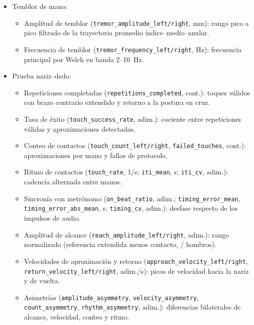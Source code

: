 \begin{sloppypar}
\begin{itemize}
    \item Temblor de mano:
    \begin{itemize}
        \item Amplitud de temblor (\texttt{tremor\_\allowbreak{}amplitude\_\allowbreak{}left/\allowbreak{}right}, mm): rango pico a pico filtrado de la trayectoria promedio índice--medio--anular.
        \item Frecuencia de temblor (\texttt{tremor\_\allowbreak{}frequency\_\allowbreak{}left/\allowbreak{}right}, Hz): frecuencia principal por Welch en banda 2--10~Hz.
    \end{itemize}

    \item Prueba nariz--dedo:
    \begin{itemize}
        \item Repeticiones completadas (\texttt{repetitions\_\allowbreak{}completed}, cont.): toques válidos con brazo contrario extendido y retorno a la postura en cruz.
        \item Tasa de éxito (\texttt{touch\_\allowbreak{}success\_\allowbreak{}rate}, adim.): cociente entre repeticiones válidas y aproximaciones detectadas.
        \item Conteo de contactos (\texttt{touch\_\allowbreak{}count\_\allowbreak{}left/\allowbreak{}right}, \texttt{failed\_\allowbreak{}touches}, cont.): aproximaciones por mano y fallos de protocolo.
        \item Ritmo de contactos (\texttt{touch\_rate}, 1/s; \texttt{iti\_mean}, s; \texttt{iti\_cv}, adim.): cadencia alternada entre manos.
        \item Sincronía con metrónomo (\texttt{on\_\allowbreak{}beat\_\allowbreak{}ratio}, adim.; \texttt{timing\_\allowbreak{}error\_\allowbreak{}mean}, \texttt{timing\_\allowbreak{}error\_\allowbreak{}abs\_\allowbreak{}mean}, s; \texttt{timing\_\allowbreak{}cv}, adim.): desfase respecto de los impulsos de audio.
        \item Amplitud de alcance (\texttt{reach\_\allowbreak{}amplitude\_\allowbreak{}left/\allowbreak{}right}, adim.): rango normalizado (referencia extendida menos contacto, / hombros).
        \item Velocidades de aproximación y retorno (\texttt{approach\_\allowbreak{}velocity\_\allowbreak{}left/\allowbreak{}right}, \texttt{return\_\allowbreak{}velocity\_\allowbreak{}left/\allowbreak{}right}, adim./s): picos de velocidad hacia la nariz y de vuelta.
        \item Asimetrías (\texttt{amplitude\_\allowbreak{}asymmetry}, \texttt{velocity\_\allowbreak{}asymmetry}, \texttt{count\_\allowbreak{}asymmetry}, \texttt{rhythm\_\allowbreak{}asymmetry}, adim.): diferencias bilaterales de alcance, velocidad, conteo y ritmo.

\end{itemize}
\end{itemize}
\end{sloppypar}
